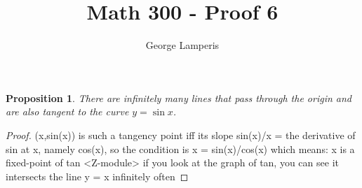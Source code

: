 \documentclass[12pt]{article}
\title{Math 300 - Proof 6}
\author{George Lamperis}
\date{}
\theoremstyle{mystyle}
\newtheorem{prop}[thm]{Proposition}
\begin{document}
\maketitle

\begin{prop}
  There are infinitely many lines that pass through the origin and are
  also tangent to the curve $y = \sin x$.
\end{prop}
\begin{proof}

(x,sin(x)) is such a tangency point iff its slope sin(x)/x = the derivative of sin at x, namely cos(x), so the condition is x = sin(x)/cos(x)  which means: x is a fixed-point of tan
<Z-module> if you look at the graph of tan, you can see it intersects the line y = x infinitely often

\end{proof}
\end{document}
